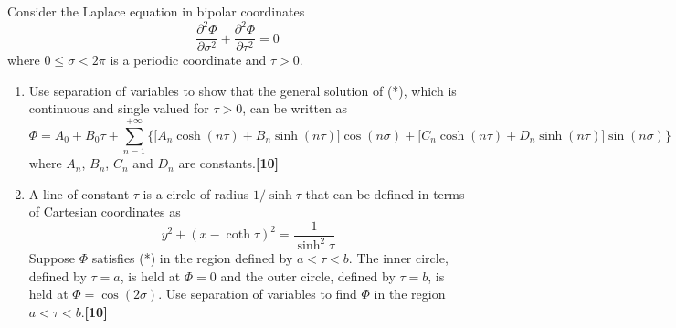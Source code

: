 \documentclass[a4paper]{article}
\begin{document}
\begin{qns}
Consider the Laplace equation in bipolar coordinates
\begin{equation}
    \frac{\partial^2\Phi}{\partial\sigma^2}+\frac{\partial^2\Phi}{\partial\tau^2}=0\tag{*}
\end{equation}
where $0\leq\sigma < 2\pi$ is a periodic coordinate and $\tau>0$.
\begin{enumerate}[label=(\alph*)]
\item Use separation of variables to show that the general solution of (*), which is continuous and single valued for $\tau>0$, can be written as 
$$\Phi=A_0+B_0\tau+\sum_{n=1}^{+\infty}\bigg\{\bigg[A_n\cosh(n\tau)+B_n\sinh(n\tau)\bigg]\cos(n\sigma)+\bigg[C_n\cosh(n\tau)+D_n\sinh(n\tau)\bigg]\sin(n\sigma)\bigg\}$$
where $A_n$, $B_n$, $C_n$ and $D_n$ are constants.\hfill\textbf{[10]}
\item A line of constant $\tau$ is a circle of radius $1/\sinh\tau$ that can be defined in terms of Cartesian coordinates as
$$y^2+(x-\coth\tau)^2=\frac{1}{\sinh^2\tau}$$
Suppose $\Phi$ satisfies (*) in the region defined by $a<\tau<b$. The inner circle, defined by $\tau= a$, is held at $\Phi=0$ and the outer circle, defined by $\tau=b$, is held at $\Phi=\cos(2\sigma)$. Use separation of variables to find $\Phi$ in the region $a<\tau<b$.\hfill\textbf{[10]}
\end{enumerate}
\end{qns}
\end{document}

